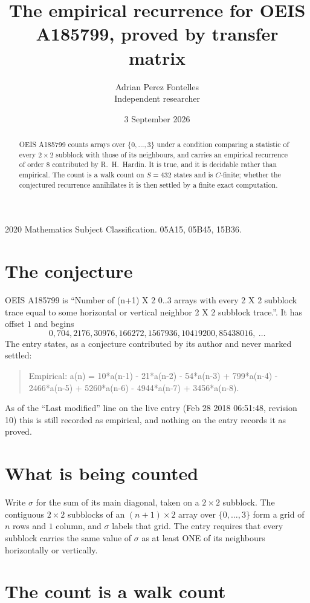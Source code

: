 \documentclass[11pt,a4paper]{article}
\title{The empirical recurrence for OEIS A185799, proved by transfer matrix}
\author{Adrian Perez Fontelles\\ \small Independent researcher}
\date{3 September 2026}
\theoremstyle{plain}
\theoremstyle{definition}
\begin{document}
\maketitle

\begin{abstract}
OEIS A185799 counts arrays over $\{0,\dots,3\}$ under a condition comparing a statistic of
every $2\times2$ subblock with those of its neighbours, and carries an empirical recurrence
of order $8$ contributed by R.~H.~Hardin. It is true, and it is decidable rather than
empirical. The count is a walk count on $S=432$ states and is $C$-finite; whether the
conjectured recurrence annihilates it is then settled by a finite exact computation.
\end{abstract}

\noindent\small 2020 Mathematics Subject Classification. 05A15, 05B45, 15B36.\normalsize

\section{The conjecture}

OEIS A185799 is ``Number of (n+1) X 2 0..3 arrays with every 2 X 2 subblock trace equal to some horizontal or vertical neighbor 2 X 2 subblock trace.''. It has offset $1$ and begins
\[
0, 704, 2176, 30976, 166272, 1567936, 10419200, 85438016,\ \dots
\]
The entry states, as a conjecture contributed by its author and never marked settled:
\begin{quote}
Empirical: a(n) = 10*a(n-1) - 21*a(n-2) - 54*a(n-3) + 799*a(n-4) - 2466*a(n-5) + 5260*a(n-6) - 4944*a(n-7) + 3456*a(n-8).
\end{quote}
As of the ``Last modified'' line on the live entry (Feb 28 2018 06:51:48, revision 10) this is still
recorded as empirical, and nothing on the entry records it as proved.

\section{What is being counted}

Write $\sigma$ for the sum of its main diagonal, taken on a $2\times2$ subblock. The contiguous $2\times2$
subblocks of an $(n+1)\times2$ array over $\{0,\dots,3\}$ form a grid of $n$ rows
and $1$ column, and $\sigma$ labels that grid. The entry
requires that every subblock carries the same value of $\sigma$ as at least ONE of its neighbours horizontally or vertically.

\section{The count is a walk count}
\end{document}
